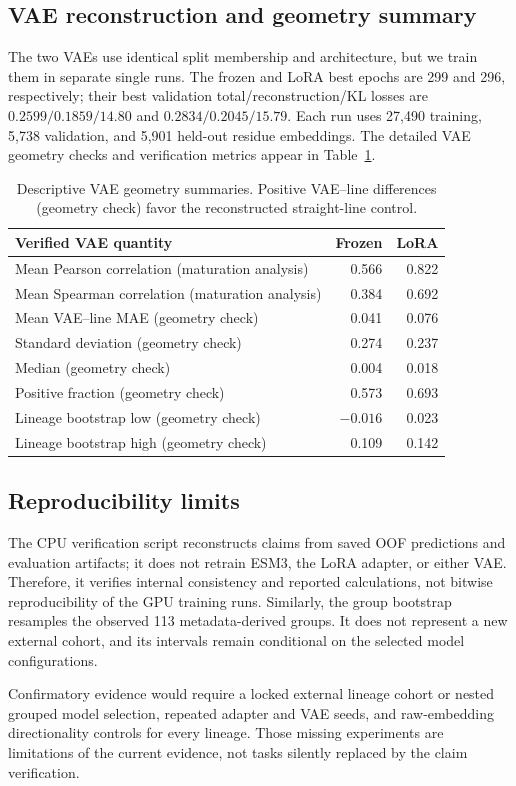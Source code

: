 \subsection{VAE reconstruction and geometry summary}

The two VAEs use identical split membership and architecture, but we train them
in separate single runs. The frozen and LoRA best epochs are 299 and 296,
respectively; their best validation total/reconstruction/KL losses are
$0.2599/0.1859/14.80$ and $0.2834/0.2045/15.79$. Each run uses 27,490 training,
5,738 validation, and 5,901 held-out residue embeddings. The detailed VAE
geometry checks and verification metrics appear in Table~\ref{tab:vae_verification}.

\begin{table}[!htbp]
\centering
\scriptsize
\setlength{\tabcolsep}{4pt}
\begin{tabular}{lrr}
\toprule
Verified VAE quantity & Frozen & LoRA \\
\midrule
Mean Pearson correlation (maturation analysis) & 0.566 & 0.822 \\
Mean Spearman correlation (maturation analysis) & 0.384 & 0.692 \\
Mean VAE--line MAE (geometry check) & 0.041 & 0.076 \\
Standard deviation (geometry check) & 0.274 & 0.237 \\
Median (geometry check) & 0.004 & 0.018 \\
Positive fraction (geometry check) & 0.573 & 0.693 \\
Lineage bootstrap low (geometry check) & $-0.016$ & 0.023 \\
Lineage bootstrap high (geometry check) & 0.109 & 0.142 \\
\bottomrule
\end{tabular}
\caption{Descriptive VAE geometry summaries. Positive VAE--line
differences (geometry check) favor the reconstructed straight-line control.}
\label{tab:vae_verification}
\end{table}


\subsection{Reproducibility limits}

The CPU verification script reconstructs claims from saved OOF predictions and
evaluation artifacts; it does not retrain ESM3, the LoRA adapter, or either
VAE\@. Therefore, it verifies internal consistency and reported calculations,
not bitwise reproducibility of the GPU training runs. Similarly, the group
bootstrap resamples the observed 113 metadata-derived groups. It does not
represent a new external cohort, and its intervals remain conditional on the
selected model configurations.

Confirmatory evidence would require a locked external lineage cohort or nested
grouped model selection, repeated adapter and VAE seeds, and raw-embedding
directionality controls for every lineage. Those missing experiments are
limitations of the current evidence, not tasks silently replaced by the claim
verification.
